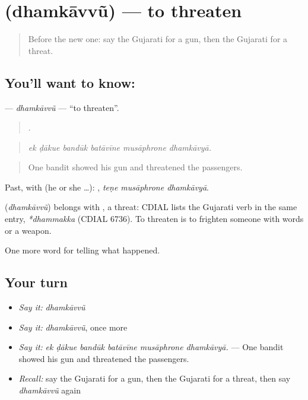 \section[\texorpdfstring{\gu{ધમકાવવું} (dhamkāvvũ)}{ધમકાવવું (dhamkāvvũ)}]{ (dhamkāvvũ) — to threaten}

\label{lesson:GU-C290-dhamkavvu}



\begin{quote}
Before the new one: say the Gujarati for a gun, then the Gujarati for a threat.
\end{quote}

\subsection*{You'll want to know: }
\textbf{} — \emph{dhamkāvvũ} — \textquotedblleft{}to threaten\textquotedblright{}.

\begin{quote}
     .
\end{quote}

\begin{quote}
\emph{ek ḍākue bandūk batāvīne musāphrone dhamkāvyā.}
\end{quote}

\begin{quote}
One bandit showed his gun and threatened the passengers.
\end{quote}

Past, with  (he or she …):   , \emph{teṇe musāphrone dhamkāvyā}.

\begin{cousinweb}
\textbf{} (\emph{dhamkāvvũ}) belongs with \textbf{}, a threat: CDIAL lists the Gujarati verb in the same entry, \emph{*dhammakka} (CDIAL 6736). To threaten is to frighten someone with words or a weapon.
\end{cousinweb}

\begin{grammarlens}[title={What you've built}]
One more word for telling what happened.
\end{grammarlens}

\subsection*{Your turn}
\begin{itemize}
\raggedright
  \item \emph{Say it:} \emph{dhamkāvvũ}
  \item \emph{Say it:} \emph{dhamkāvvũ}, once more
  \item \emph{Say it:} \emph{ek ḍākue bandūk batāvīne musāphrone dhamkāvyā.} — One bandit showed his gun and threatened the passengers.
  \item \emph{Recall:} say the Gujarati for a gun, then the Gujarati for a threat, then say \emph{dhamkāvvũ} again
\end{itemize}

